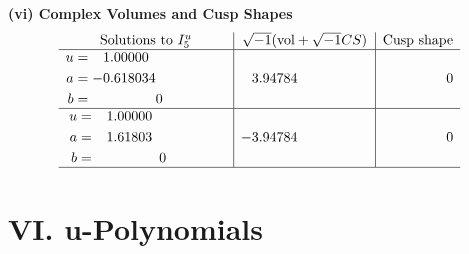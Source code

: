 \documentclass[1p]{elsarticle_modified}
\theoremstyle{definition}
\newcommand{\I}{\sqrt{-1}}
\begin{document}
\newpage\flushleft \textbf{(vi) Complex Volumes and Cusp Shapes}
$$\begin{array}{c|c|c}  
\text{Solutions to }I^u_{5}& \I (\text{vol} + \sqrt{-1}CS) & \text{Cusp shape}\\
 \hline 
\begin{aligned}
u &= \phantom{-}1.00000\phantom{ +0.000000I} \\
a &= -0.618034\phantom{ +0.000000I} \\
b &= \phantom{-0.000000 } 0\end{aligned}
 & \phantom{-}3.94784\phantom{ +0.000000I} & \phantom{-0.000000 } 0 \\ \hline\begin{aligned}
u &= \phantom{-}1.00000\phantom{ +0.000000I} \\
a &= \phantom{-}1.61803\phantom{ +0.000000I} \\
b &= \phantom{-0.000000 } 0\end{aligned}
 & -3.94784\phantom{ +0.000000I} & \phantom{-0.000000 } 0\\
 \hline 
 \end{array}$$\newpage
\newpage\renewcommand{\arraystretch}{1}
\centering \section*{ VI. u-Polynomials}
\end{document}
